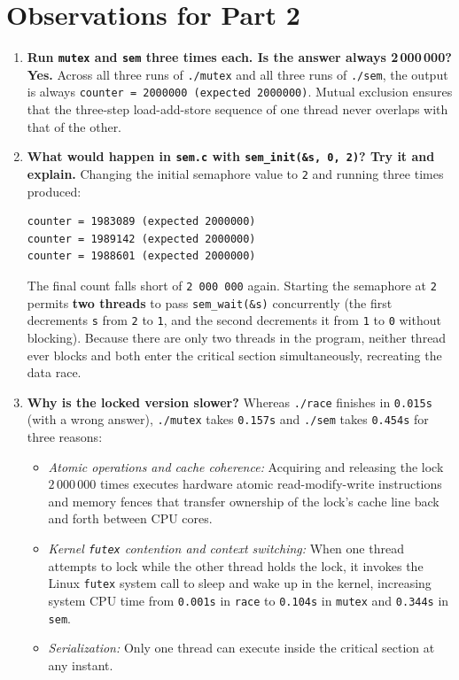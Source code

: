 \documentclass{../latex/utmreport}
\providecommand{\tightlist}{\setlength{\itemsep}{0pt}\setlength{\parskip}{0pt}}
\begin{document}
\section{Observations for Part 2}

\begin{enumerate}
\tightlist
\item \textbf{Run \texttt{mutex} and \texttt{sem} three times each. Is the answer always 2\,000\,000?}
\textbf{Yes.} Across all three runs of \texttt{./mutex} and all three runs of \texttt{./sem}, the output is always \texttt{counter = 2000000 (expected 2000000)}. Mutual exclusion ensures that the three-step load-add-store sequence of one thread never overlaps with that of the other.

\item \textbf{What would happen in \texttt{sem.c} with \texttt{sem\_init(\&s, 0, 2)}? Try it and explain.}
Changing the initial semaphore value to \texttt{2} and running three times produced:
\begin{lstlisting}
counter = 1983089 (expected 2000000)
counter = 1989142 (expected 2000000)
counter = 1988601 (expected 2000000)
\end{lstlisting}
The final count falls short of \texttt{2\,000\,000} again. Starting the semaphore at \texttt{2} permits \textbf{two threads} to pass \texttt{sem\_wait(\&s)} concurrently (the first decrements \texttt{s} from \texttt{2} to \texttt{1}, and the second decrements it from \texttt{1} to \texttt{0} without blocking). Because there are only two threads in the program, neither thread ever blocks and both enter the critical section simultaneously, recreating the data race.

\item \textbf{Why is the locked version slower?}
Whereas \texttt{./race} finishes in \texttt{0.015s} (with a wrong answer), \texttt{./mutex} takes \texttt{0.157s} and \texttt{./sem} takes \texttt{0.454s} for three reasons:
\begin{itemize}
\tightlist
\item \emph{Atomic operations and cache coherence:} Acquiring and releasing the lock $2\,000\,000$ times executes hardware atomic read-modify-write instructions and memory fences that transfer ownership of the lock's cache line back and forth between CPU cores.
\item \emph{Kernel \texttt{futex} contention and context switching:} When one thread attempts to lock while the other thread holds the lock, it invokes the Linux \texttt{futex} system call to sleep and wake up in the kernel, increasing system CPU time from \texttt{0.001s} in \texttt{race} to \texttt{0.104s} in \texttt{mutex} and \texttt{0.344s} in \texttt{sem}.
\item \emph{Serialization:} Only one thread can execute inside the critical section at any instant.
\end{itemize}
\end{enumerate}
\end{document}
